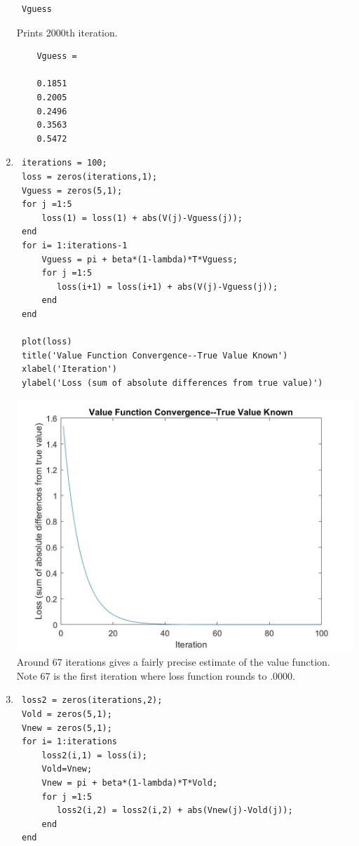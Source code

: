 \documentclass[12pt]{article}
\begin{document}
\begin{onehalfspace}
\begin{enumerate}[1.]
\begin{lstlisting}
 Vguess
	\end{lstlisting}
	Prints 2000th iteration.
	\begin{lstlisting}
	Vguess =

    0.1851
    0.2005
    0.2496
    0.3563
    0.5472
	\end{lstlisting}
	
	\item
	\begin{lstlisting}
 iterations = 100;
 loss = zeros(iterations,1);
 Vguess = zeros(5,1);
 for j =1:5
     loss(1) = loss(1) + abs(V(j)-Vguess(j));
 end
 for i= 1:iterations-1
     Vguess = pi + beta*(1-lambda)*T*Vguess;
     for j =1:5
        loss(i+1) = loss(i+1) + abs(V(j)-Vguess(j));
     end
 end
 
 plot(loss)
 title('Value Function Convergence--True Value Known')
 xlabel('Iteration')
 ylabel('Loss (sum of absolute differences from true value)')
	\end{lstlisting}
	\includegraphics[width=\textwidth]{Econ_8307_PS2_4_3.jpg}
	Around 67 iterations gives a fairly precise estimate of the value function. Note 67 is the first iteration where loss function rounds to .0000.
 
	\item
	\begin{lstlisting}
 loss2 = zeros(iterations,2);
 Vold = zeros(5,1);
 Vnew = zeros(5,1);
 for i= 1:iterations
     loss2(i,1) = loss(i);
     Vold=Vnew;
     Vnew = pi + beta*(1-lambda)*T*Vold;
     for j =1:5
        loss2(i,2) = loss2(i,2) + abs(Vnew(j)-Vold(j));
     end
 end
 

\end{lstlisting}
\end{enumerate}
\end{onehalfspace}
\end{document}
